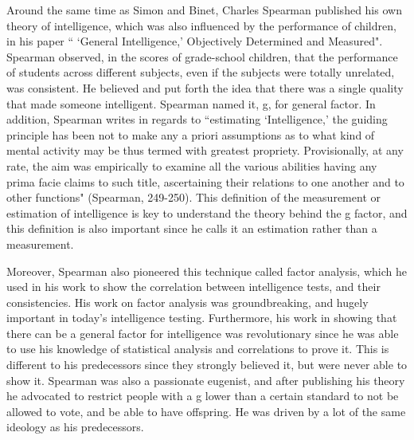 \documentclass[12pt, oneside]{article}
\begin{document}
\par Around the same time as Simon and Binet, Charles Spearman published his own theory of intelligence, which was also influenced by the performance of children, in his paper ``
`General Intelligence,' Objectively Determined and Measured". Spearman observed, in the scores of grade-school children, that the performance of students across different subjects, even if the subjects were totally unrelated, was consistent. He believed and put forth the idea that there was a single quality that made someone intelligent. Spearman named it, g, for general factor. In addition, Spearman writes in regards to ``estimating `Intelligence,' the guiding principle has been not to make any a priori assumptions as to what kind of mental activity may be thus termed with greatest propriety. Provisionally, at any rate, the aim was empirically to examine all the various abilities having any prima facie claims to such title, ascertaining their relations to one another and to other functions" (Spearman, 249-250). This definition of the measurement or estimation of intelligence is key to understand the theory behind the g factor, and this definition is also important since he calls it an estimation rather than a measurement.

\par Moreover, Spearman also pioneered this technique called factor analysis, which he used in his work to show the correlation between intelligence tests, and their consistencies. His work on factor analysis was groundbreaking, and hugely important in today's intelligence testing. Furthermore, his work in showing that there can be a general factor for intelligence was revolutionary since he was able to use his knowledge of statistical analysis and correlations to prove it. This is different to his predecessors since they strongly believed it, but were never able to show it. Spearman was also a passionate eugenist, and after publishing his theory he advocated to restrict people with a g lower than a certain standard to not be allowed to vote, and be able to have offspring. He was driven by a lot of the same ideology as his predecessors. 

\end{document}
